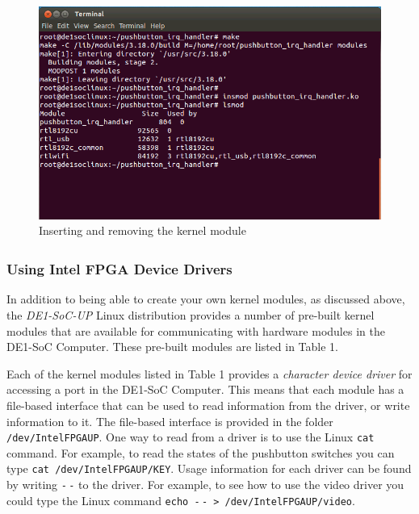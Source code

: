 \documentclass[11pt, twoside, pdftex]{article}
\begin{document}
\begin{figure}[H]
   \begin{center}
       \includegraphics[scale=0.7]{figures/insmod.png}
   \end{center}
   \caption{Inserting and removing the kernel module}
	\label{fig:kernel_module_2}
\end{figure}

\subsubsection{Using Intel\textsuperscript{\textregistered} FPGA Device Drivers}

\noindent In addition to being able to create your own kernel modules, as 
discussed above, the \textit{DE1-SoC-UP} Linux distribution provides a number of pre-built
kernel modules that are available for communicating with hardware modules in the DE1-SoC 
Computer. These pre-built modules are listed in Table 1.

Each of the kernel modules listed in Table 1 provides a {\it character device driver} for
accessing a port in the DE1-SoC Computer. This means that each module has a file-based
interface that can be used to read information from the driver, or write information to
it. The file-based interface is provided in the folder \texttt{/dev/IntelFPGAUP}. One way to
read from a driver is to use the Linux \texttt{cat} command. For example, to read the
states of the pushbutton switches you can type \texttt{cat /dev/IntelFPGAUP/KEY}. Usage 
information for each driver can be found by writing \texttt{-$\,$-} to the driver. For example, 
to see how to use the video driver you could type the Linux command
\texttt{echo -$\,$- > /dev/IntelFPGAUP/video}. 
\end{document}
